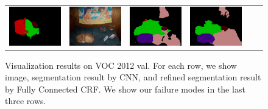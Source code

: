 \begin{figure}[!htbp]
{\begin{tabular}{c c c | c c c}
    \includegraphics[height=0.12\linewidth]{fig/res_crf/2007_000452.png} &
    \includegraphics[height=0.12\linewidth]{fig/img/2007_002268.jpg} &
    \includegraphics[height=0.12\linewidth]{fig/res_none/2007_002268.png} &
    \includegraphics[height=0.12\linewidth]{fig/res_crf/2007_002268.png} \\
  \end{tabular}
  }
  \caption{Visualization results on VOC 2012 val. For each row, we show image, segmentation result by CNN, and refined segmentation result by Fully Connected CRF. We show our failure modes in the last three rows.} 
  \label{fig:ValResults}
\end{figure}

